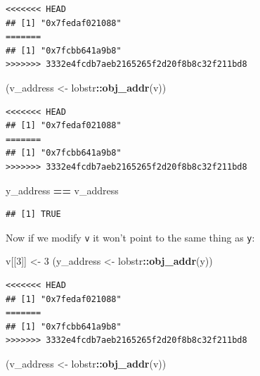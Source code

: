\documentclass[]{book}
\newenvironment{Shaded}{\begin{snugshade}}{\end{snugshade}}
\newcommand{\DecValTok}[1]{\textcolor[rgb]{0.00,0.00,0.81}{#1}}
\newcommand{\KeywordTok}[1]{\textcolor[rgb]{0.13,0.29,0.53}{\textbf{#1}}}
\newcommand{\NormalTok}[1]{#1}
\newcommand{\OperatorTok}[1]{\textcolor[rgb]{0.81,0.36,0.00}{\textbf{#1}}}
\newcommand{\StringTok}[1]{\textcolor[rgb]{0.31,0.60,0.02}{#1}}
\begin{document}
\begin{verbatim}
<<<<<<< HEAD
## [1] "0x7fedaf021088"
=======
## [1] "0x7fcbb641a9b8"
>>>>>>> 3332e4fcdb7aeb2165265f2d20f8b8c32f211bd8
\end{verbatim}

\begin{Shaded}
\begin{Highlighting}[]
\NormalTok{(v_address <-}\StringTok{ }\NormalTok{lobstr}\OperatorTok{::}\KeywordTok{obj_addr}\NormalTok{(v))}
\end{Highlighting}
\end{Shaded}

\begin{verbatim}
<<<<<<< HEAD
## [1] "0x7fedaf021088"
=======
## [1] "0x7fcbb641a9b8"
>>>>>>> 3332e4fcdb7aeb2165265f2d20f8b8c32f211bd8
\end{verbatim}

\begin{Shaded}
\begin{Highlighting}[]
\NormalTok{y_address }\OperatorTok{==}\StringTok{ }\NormalTok{v_address}
\end{Highlighting}
\end{Shaded}

\begin{verbatim}
## [1] TRUE
\end{verbatim}

Now if we modify \texttt{v} it won't point to the same thing as \texttt{y}:

\begin{Shaded}
\begin{Highlighting}[]
\NormalTok{v[[}\DecValTok{3}\NormalTok{]] <-}\StringTok{ }\DecValTok{3}
\NormalTok{(y_address <-}\StringTok{ }\NormalTok{lobstr}\OperatorTok{::}\KeywordTok{obj_addr}\NormalTok{(y))}
\end{Highlighting}
\end{Shaded}

\begin{verbatim}
<<<<<<< HEAD
## [1] "0x7fedaf021088"
=======
## [1] "0x7fcbb641a9b8"
>>>>>>> 3332e4fcdb7aeb2165265f2d20f8b8c32f211bd8
\end{verbatim}

\begin{Shaded}
\begin{Highlighting}[]
\NormalTok{(v_address <-}\StringTok{ }\NormalTok{lobstr}\OperatorTok{::}\KeywordTok{obj_addr}\NormalTok{(v))}
\end{Highlighting}
\end{Shaded}
\end{document}
